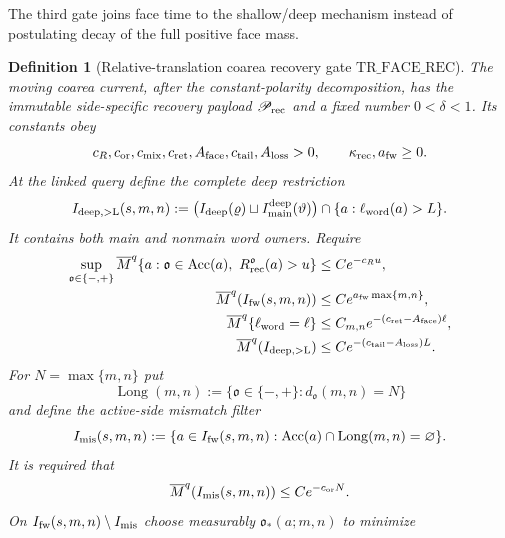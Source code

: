 \documentclass[11pt]{article}
\newtheorem{definition}[theorem]{Definition}
\begin{document}
The third gate joins face time to the shallow/deep mechanism instead of
postulating decay of the full positive face mass.

\begin{definition}[Relative-translation coarea recovery gate
$\mathrm{TR\_FACE\_REC}$]
\label{def:translation-face-recovery}
The moving coarea current, after the constant-polarity decomposition, has
the immutable side-specific recovery payload $\mathscr P_{\rm rec}$ and a
fixed number $0<\delta<1$.  Its constants obey
\[
 c_R,c_{\rm or},c_{\rm mix},c_{\rm ret},A_{\rm face},
 c_{\rm tail},A_{\rm loss}>0,\qquad
 \kappa_{\rm rec},a_{\rm fw}\ge0.
\]
At the linked query define the complete deep restriction
\begin{equation}
\label{eq:translation-complete-deep-owner}
 I_{\rm deep,>L}(s,m,n):=
 \bigl(I_{\rm deep}(\varrho)\sqcup
       I_{\rm main}^{\rm deep}(\vartheta)\bigr)
       \cap\{a:\ell_{\rm word}(a)>L\}.
\end{equation}
It contains both main and nonmain word owners.  Require
\begin{align}
 \sup_{\mathfrak o\in\{-,+\}}
 \overline M^q\{a:\mathfrak o\in\operatorname{Acc}(a),\
                  R_{\rm rec}^{\mathfrak o}(a)>u\}
 &\le Ce^{-c_Ru},
 \label{eq:translation-recovery-tail}\\
 \overline M^q(I_{\rm fw}(s,m,n))
 &\le Ce^{a_{\rm fw}\max\{m,n\}},
 \label{eq:translation-face-envelope-growth}\\
 \overline M^q\{\ell_{\rm word}=\ell\}
 &\le C_{m,n}e^{-(c_{\rm ret}-A_{\rm face})\ell},
 \label{eq:translation-word-tail}\\
 \overline M^q(I_{\rm deep,>L})
 &\le Ce^{-(c_{\rm tail}-A_{\rm loss})L}.
 \label{eq:translation-deep-tail}
\end{align}
For $N=\max\{m,n\}$ put
\[
 \operatorname{Long}(m,n):=\{\mathfrak o\in\{-,+\}:
                     d_{\mathfrak o}(m,n)=N\}
\]
and define the active-side mismatch filter
\begin{equation}
\label{eq:translation-orientation-mismatch}
 I_{\rm mis}(s,m,n):=
 \{a\in I_{\rm fw}(s,m,n):
       \operatorname{Acc}(a)\cap\operatorname{Long}(m,n)=\varnothing\}.
\end{equation}
It is required that
\begin{equation}
\label{eq:translation-orientation-mismatch-tail}
 \overline M^q(I_{\rm mis}(s,m,n))\le Ce^{-c_{\rm or}N}.
\end{equation}
On $I_{\rm fw}(s,m,n)\setminus I_{\rm mis}$ choose measurably
$\mathfrak o_*(a;m,n)$ to minimize

\end{definition}
\end{document}
